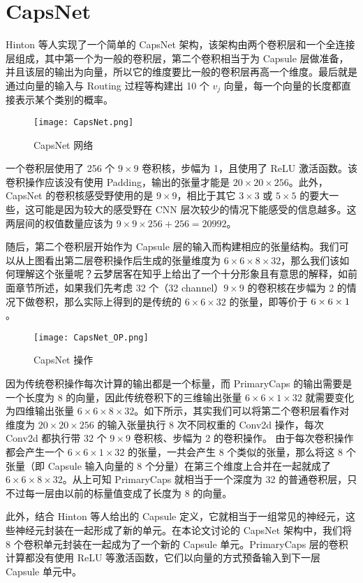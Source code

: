 \section{CapsNet}
Hinton 等人实现了一个简单的 CapsNet 架构，该架构由两个卷积层和一个全连接层组成，其中第一个为一般的卷积层，第二个卷积相当于为 Capsule 层做准备，并且该层的输出为向量，所以它的维度要比一般的卷积层再高一个维度。最后就是通过向量的输入与 Routing 过程等构建出 10 个 $v_j$ 向量，每一个向量的长度都直接表示某个类别的概率。
\begin{figure}[H]
	\centering
	\texttt{[image: CapsNet.png]}
	\caption{CapsNet 网络}
	\label{fig:2}
\end{figure}
一个卷积层使用了 256 个 $9\times9$ 卷积核，步幅为 1，且使用了 ReLU 激活函数。该卷积操作应该没有使用 Padding，输出的张量才能是 $20\times20\times256$。此外，CapsNet 的卷积核感受野使用的是 $9\times9$，相比于其它 $3\times3$ 或 $5\times5$ 的要大一些，这可能是因为较大的感受野在 CNN 层次较少的情况下能感受的信息越多。这两层间的权值数量应该为 $9\times9\times256+256=20992$。

随后，第二个卷积层开始作为 Capsule 层的输入而构建相应的张量结构。我们可以从上图看出第二层卷积操作后生成的张量维度为 $6\times6\times8\times32$，那么我们该如何理解这个张量呢？云梦居客在知乎上给出了一个十分形象且有意思的解释，如前面章节所述，如果我们先考虑 32 个（32 channel）$9\times9$ 的卷积核在步幅为 2 的情况下做卷积，那么实际上得到的是传统的 $6\times6\times32$ 的张量，即等价于 $6\times6\times1\time32$。
\begin{figure}[H]
	\centering
	\texttt{[image: CapsNet\_OP.png]}
	\caption{CapsNet 操作}
	\label{fig:3}
\end{figure}


因为传统卷积操作每次计算的输出都是一个标量，而 PrimaryCaps 的输出需要是一个长度为 8 的向量，因此传统卷积下的三维输出张量 $6\times6\times1\times32$ 就需要变化为四维输出张量 $6\times6\times8\times32$。如下所示，其实我们可以将第二个卷积层看作对维度为 $20\times20\times256$ 的输入张量执行 8 次不同权重的 Conv2d 操作，每次 Conv2d 都执行带 32 个 $9\times9$ 卷积核、步幅为 2 的卷积操作。
由于每次卷积操作都会产生一个 $6\times6\times1\times32$ 的张量，一共会产生 8 个类似的张量，那么将这 8 个张量（即 Capsule 输入向量的 8 个分量）在第三个维度上合并在一起就成了 $6\times6\times8\times32$。从上可知 PrimaryCaps 就相当于一个深度为 32 的普通卷积层，只不过每一层由以前的标量值变成了长度为 8 的向量。

此外，结合 Hinton 等人给出的 Capsule 定义，它就相当于一组常见的神经元，这些神经元封装在一起形成了新的单元。在本论文讨论的 CapsNet 架构中，我们将 8 个卷积单元封装在一起成为了一个新的 Capsule 单元。PrimaryCaps 层的卷积计算都没有使用 ReLU 等激活函数，它们以向量的方式预备输入到下一层 Capsule 单元中。

